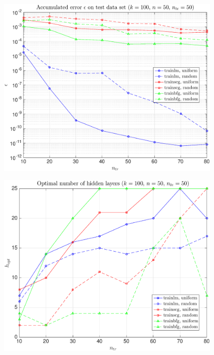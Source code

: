 \documentclass[11pt,a4paper]{article}
\theoremstyle{definition}
\theoremstyle{theorem}
\begin{document}
	\begin{figure}
		\center
		\includegraphics[scale=0.5]{fig9}
		\caption{}
	\end{figure}
	
	\begin{figure}
		\center
		\includegraphics[scale=0.5]{fig10}
		\caption{}
	\end{figure}
	
\end{document}
